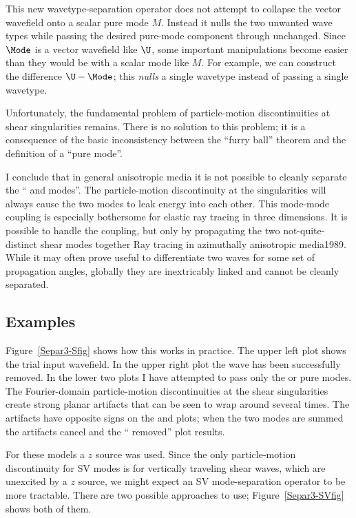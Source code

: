 This new wavetype-separation operator does not attempt to
collapse the vector wavefield onto a scalar pure mode $M$. Instead
it nulls the two unwanted wave types while passing the desired
pure-mode component through unchanged.
Since $\Mode$ is a vector wavefield like $\U$, some important
manipulations become easier than they would be with a scalar mode like $M$.
For example, we can construct the difference $\U - \Mode$;
this {\it nulls}\/ a single wavetype instead of passing a single wavetype.

Unfortunately, the fundamental problem of particle-motion discontinuities
at shear singularities remains. There is no solution to this problem;
it is a consequence of the basic inconsistency between
the ``furry ball'' theorem and
the definition of a {\qS} ``pure mode''.

I conclude that in general anisotropic media it is not possible
to cleanly separate the ``{} and {} modes''. The particle-motion
discontinuity at the singularities will always cause the two
modes to leak energy into each other.
This mode-mode coupling is especially bothersome for elastic ray tracing in
three dimensions.
It is possible to handle the coupling,
but only by propagating the two not-quite-distinct shear modes together
{Ray tracing in azimuthally anisotropic media}{1989}.
While it may often prove useful to differentiate two {\qS} waves
for some set of propagation angles,
globally they are inextricably linked and cannot be cleanly
separated.

\subsection{Examples}
Figure~\ref{Separ3-Sfig} shows how this works in practice.
The upper left plot shows the trial input wavefield.
In the upper right plot the {\qP} wave has been successfully removed.
In the lower two plots I have attempted to pass only the {} or
{} pure modes. The Fourier-domain particle-motion discontinuities
at the shear singularities create strong planar artifacts that can
be seen to wrap around several times. The artifacts have opposite
signs on the {} and {} plots; when the two {\qS} modes are summed
the artifacts cancel and the ``{\qP} removed'' plot results.

For these models a $z$ source was used.
Since the only particle-motion discontinuity for SV modes is for
vertically traveling shear waves, which are unexcited by a $z$ source,
we might expect an SV mode-separation operator to be more tractable.
There are two possible approaches to use; Figure~\ref{Separ3-SVfig}
shows both of them.

